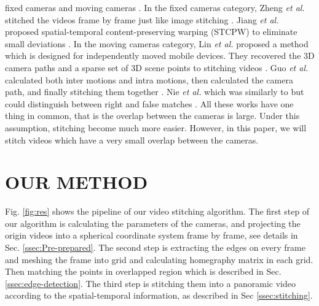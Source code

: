 \documentclass[conference]{IEEEtran}
\begin{document}
fixed cameras \cite{zheng2008stitching, he2010panoramic, Jiang_2015_CVPR_Workshops, perazzi2015panoramic, li2015efficient} 
and moving cameras \cite{lin2016seamless, guo2016joint, nie2018dynamic}. In the fixed cameras category, 
Zheng \textit{et al.} stitched the videos frame by frame just like image stitching \cite{zheng2008stitching}.
Jiang \textit{et al.} proposed spatial-temporal content-preserving warping (STCPW) to eliminate small deviations \cite{Jiang_2015_CVPR_Workshops}.
In the moving cameras category, Lin \textit{et al.} proposed a method which is designed for independently moved mobile devices.
They recovered the 3D camera paths and a sparse set of 3D scene points to stitching videos \cite{lin2016seamless}.
Guo \textit{et al.} calculated both inter motions and intra motions, then calculated the camera path, and finally stitching them together \cite{guo2016joint}.
Nie \textit{et al.} which was similarly to \cite{guo2016joint} but could distinguish between right
and false matches \cite{nie2018dynamic}. All these works have one thing in common, that
is the overlap between the cameras is large. Under this assumption, stitching 
become much more easier. However, in this paper, we will stitch videos
which have a very small overlap between the cameras.

\section{OUR METHOD}
\label{sec:ourmethod}

Fig. \ref{fig:res} shows the pipeline of our video stitching algorithm.
The first step of our algorithm is calculating the parameters of the cameras, and projecting the origin videos into a spherical coordinate system frame by frame, 
see details in Sec. \ref{ssec:Pre-prepared}. The second step is extracting the edges on every frame and meshing the frame into grid and calculating homegraphy matrix in each grid. 
Then matching the points in overlapped region which is described in Sec. \ref{ssec:edge-detection}. 
The third step is stitching them into a panoramic video according to the spatial-temporal information, as described in Sec \ref{ssec:stitching}.
\end{document}
